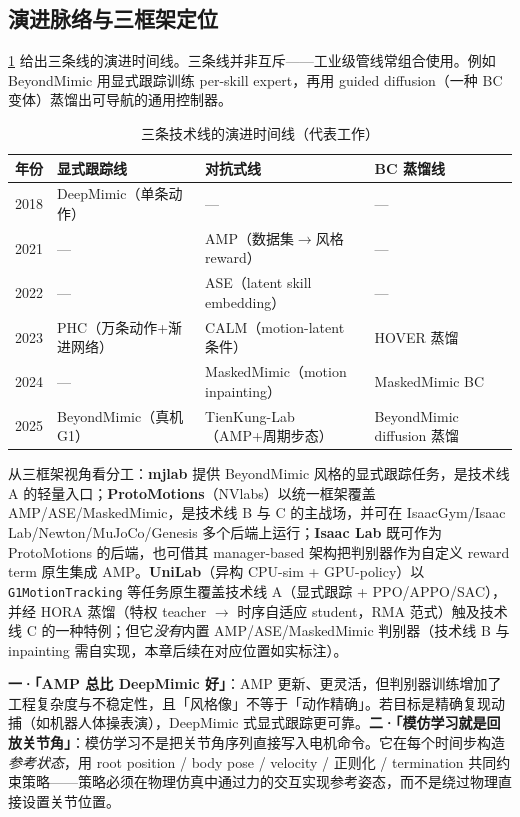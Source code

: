 \subsection{演进脉络与三框架定位}
\label{sec:rlmc-imit-lines-frameworks}

\cref{tab:rlmc-imit-evolution} 给出三条线的演进时间线。三条线并非互斥——工业级管线常组合使用。例如 BeyondMimic 用显式跟踪训练 per-skill expert，再用 guided diffusion（一种 BC 变体）蒸馏出可导航的通用控制器。

\begin{table}[ht]
\centering
\small
\caption{三条技术线的演进时间线（代表工作）}
\label{tab:rlmc-imit-evolution}
\begin{tabular}{@{}llll@{}}
\toprule
年份 & 显式跟踪线 & 对抗式线 & BC 蒸馏线 \\
\midrule
2018 & DeepMimic（单条动作） & --- & --- \\
2021 & --- & AMP（数据集$\to$风格 reward） & --- \\
2022 & --- & ASE（latent skill embedding） & --- \\
2023 & PHC（万条动作+渐进网络） & CALM（motion-latent 条件） & HOVER 蒸馏 \\
2024 & --- & MaskedMimic（motion inpainting） & MaskedMimic BC \\
2025 & BeyondMimic（真机 G1） & TienKung-Lab（AMP+周期步态） & BeyondMimic diffusion 蒸馏 \\
\bottomrule
\end{tabular}
\end{table}

从三框架视角看分工：\textbf{mjlab} 提供 BeyondMimic 风格的显式跟踪任务，是技术线 A 的轻量入口；\textbf{ProtoMotions}（NVlabs）以统一框架覆盖 AMP/ASE/MaskedMimic，是技术线 B 与 C 的主战场，并可在 IsaacGym/Isaac Lab/Newton/MuJoCo/Genesis 多个后端上运行；\textbf{Isaac Lab} 既可作为 ProtoMotions 的后端，也可借其 manager-based 架构把判别器作为自定义 reward term 原生集成 AMP。\textbf{UniLab}（异构 CPU-sim + GPU-policy）以 \texttt{G1MotionTracking} 等任务原生覆盖技术线 A（显式跟踪 + PPO/APPO/SAC），并经 HORA 蒸馏（特权 teacher $\to$ 时序自适应 student，RMA 范式）触及技术线 C 的一种特例；但它\emph{没有}内置 AMP/ASE/MaskedMimic 判别器（技术线 B 与 inpainting 需自实现，本章后续在对应位置如实标注）。

\begin{pitfall}[模仿学习的两个高频误解]
\textbf{一·「AMP 总比 DeepMimic 好」}：AMP 更新、更灵活，但判别器训练增加了工程复杂度与不稳定性，且「风格像」不等于「动作精确」。若目标是精确复现动捕（如机器人体操表演），DeepMimic 式显式跟踪更可靠。\textbf{二·「模仿学习就是回放关节角」}：模仿学习不是把关节角序列直接写入电机命令。它在每个时间步构造\emph{参考状态}，用 root position / body pose / velocity / 正则化 / termination 共同约束策略——策略必须在物理仿真中通过力的交互实现参考姿态，而不是绕过物理直接设置关节位置。
\end{pitfall}

